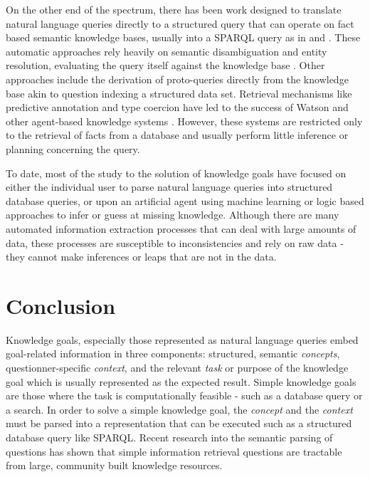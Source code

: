 \documentclass{llncs}
\begin{document}

On the other end of the spectrum, there has been work designed to translate natural language queries directly to a structured query that can operate on fact based semantic knowledge bases, usually into a SPARQL query as in \cite{yahya_natural_2012,unger_template-based_2012} and \cite{berant_semantic_2013}. These automatic approaches rely heavily on semantic disambiguation and entity resolution, evaluating the query itself against the knowledge base \cite{zheng_entity_2012}. Other approaches include the derivation of proto-queries directly from the knowledge base \cite{frank_question_2007} akin to question indexing a structured data set. Retrieval mechanisms like predictive annotation and type coercion have led to the success of Watson and other agent-based knowledge systems \cite{prager_question_2006,kalyanpur_leveraging_2011}. However, these systems are restricted only to the retrieval of facts from a database and usually perform little inference or planning concerning the query.

To date, most of the study to the solution of knowledge goals have focused on either the individual user to parse natural language queries into structured database queries, or upon an artificial agent using machine learning or logic based approaches to infer or guess at missing knowledge. Although there are many automated information extraction processes that can deal with large amounts of data, these processes are susceptible to inconsistencies and rely on raw data - they cannot make inferences or leaps that are not in the data.

\section{Conclusion}

Knowledge goals, especially those represented as natural language queries embed goal-related information in three components: structured, semantic \textit{concepts}, questionner-specific \textit{context}, and the relevant \textit{task} or purpose of the knowledge goal which is usually represented as the expected result. Simple knowledge goals are those where the task is computationally feasible - such as a database query or a search. In order to solve a simple knowledge goal, the \textit{concept} and the \textit{context} must be parsed into a representation that can be executed such as a structured database query like SPARQL. Recent research into the semantic parsing of questions has shown that simple information retrieval questions are tractable from large, community built knowledge resources.
\end{document}
